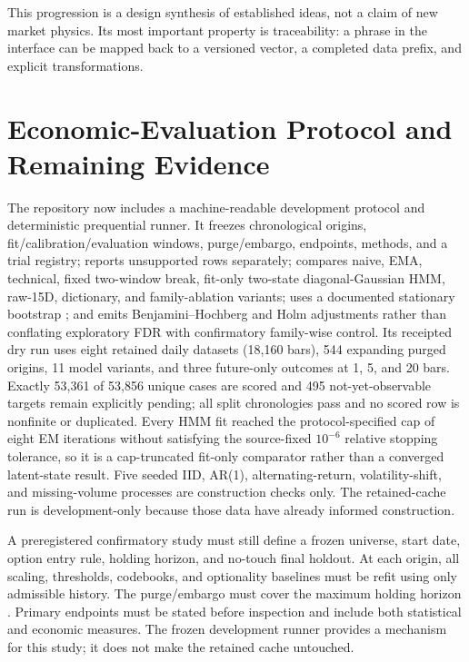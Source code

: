 \documentclass{article}
\begin{document}
This progression is a design synthesis of established ideas, not a claim of new market physics. Its most important property is traceability: a phrase in the interface can be mapped back to a versioned vector, a completed data prefix, and explicit transformations.

\section{Economic-Evaluation Protocol and Remaining Evidence}
\label{app:future}

The repository now includes a machine-readable development protocol and deterministic prequential runner. It freezes chronological origins, fit/calibration/evaluation windows, purge/embargo, endpoints, methods, and a trial registry; reports unsupported rows separately; compares naive, EMA, technical, fixed two-window break, fit-only two-state diagonal-Gaussian HMM, raw-15D, dictionary, and family-ablation variants; uses a documented stationary bootstrap \citep{politisromano1994stationary}; and emits Benjamini--Hochberg and Holm adjustments rather than conflating exploratory FDR with confirmatory family-wise control. Its receipted dry run uses eight retained daily datasets (18,160 bars), 544 expanding purged origins, 11 model variants, and three future-only outcomes at 1, 5, and 20 bars. Exactly 53,361 of 53,856 unique cases are scored and 495 not-yet-observable targets remain explicitly pending; all split chronologies pass and no scored row is nonfinite or duplicated. Every HMM fit reached the protocol-specified cap of eight EM iterations without satisfying the source-fixed $10^{-6}$ relative stopping tolerance, so it is a cap-truncated fit-only comparator rather than a converged latent-state result. Five seeded IID, AR(1), alternating-return, volatility-shift, and missing-volume processes are construction checks only. The retained-cache run is development-only because those data have already informed construction.

A preregistered confirmatory study must still define a frozen universe, start date, option entry rule, holding horizon, and no-touch final holdout. At each origin, all scaling, thresholds, codebooks, and optionality baselines must be refit using only admissible history. The purge/embargo must cover the maximum holding horizon \citep{lopezdeprado2018advances}. Primary endpoints must be stated before inspection and include both statistical and economic measures. The frozen development runner provides a mechanism for this study; it does not make the retained cache untouched.
\end{document}
